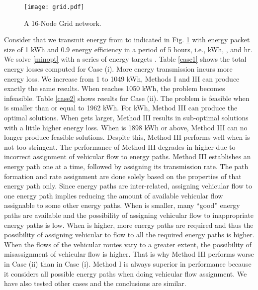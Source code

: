 \documentclass[journal]{IEEEtran}
\begin{document}
\begin{figure}[!t]
\centering
\texttt{[image: grid.pdf]}
\caption{A 16-Node Grid network.}
\label{fig:grid}
\end{figure}

Consider that we transmit energy from  to  indicated in Fig. \ref{fig:grid} with energy packet size of 1 kWh and 0.9 energy efficiency in a period of 5 hours, i.e.,  kWh, , and  hr. We solve \eqref{minopt} with a series of energy targets . Table \ref{case1} shows the total energy losses computed for Case (i). More energy transmission incurs more energy loss. We increase  from 1 to 1049 kWh, Methods I and III can produce exactly the same results. When  reaches 1050 kWh, the problem becomes infeasible. Table \ref{case2} shows results for Case (ii). The problem is feasible when  is smaller than or equal to 1962 kWh. For  kWh, Method III can produce the optimal solutions. When  gets larger, Method III results in sub-optimal solutions with a little higher energy loss. When  is 1898 kWh or above, Method III can no longer produce feasible solutions. Despite this, Method III performs well when  is not too stringent. 
The performance of Method III degrades in higher  due to incorrect assignment of vehicular flow to energy paths. Method III establishes an energy path one at a time, followed by assigning its transmission rate. The path formation and rate assignment are done solely based on the properties of that energy path only. Since energy paths are inter-related, assigning vehicular flow to one energy path implies reducing the amount of available vehicular flow assignable to some other energy paths. When  is smaller, many ``good'' energy paths are available and the possibility of assigning vehicular flow to inappropriate energy paths is low. When  is higher, more energy paths are required and thus the possibility of assigning vehicular to flow to all the required energy paths is higher. When the flows of the vehicular routes vary to a greater extent, the possibility of misassignment of vehicular flow is higher. That is why Method III performs worse in Case (ii) than in Case (i). Method I is always superior in performance because it considers all possible energy paths when doing vehicular flow assignment.  
We have also tested other cases and the conclusions are similar. 
\end{document}
